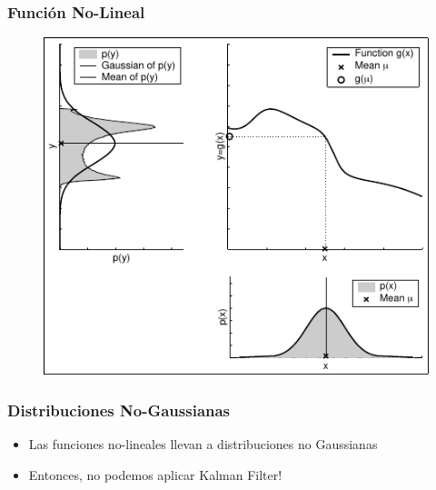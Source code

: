 \begin{frame}
    \frametitle{Función No-Lineal}
    
    \begin{figure}[!h]
        \includegraphics[width=0.5\columnwidth]{./images/nonlinear_transformation_of_a_gaussian.pdf}
    \end{figure}
\end{frame}


\begin{frame}
    \frametitle{Distribuciones No-Gaussianas}
    
    
    \begin{itemize}
        \item Las funciones no-lineales llevan a distribuciones no Gaussianas
        \item Entonces, no podemos aplicar Kalman Filter!
    \end{itemize}
    
\end{frame}

